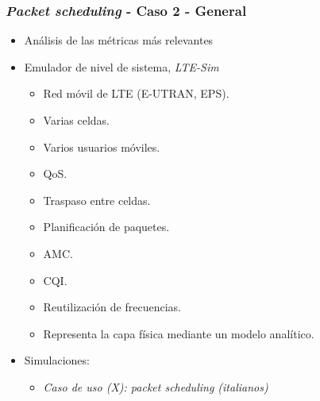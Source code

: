 \documentclass{beamer}
\begin{document}
\begin{frame}
\frametitle{\textit{Packet scheduling} - Caso 2 - General}

\begin{itemize}
\item Análisis de las métricas más relevantes
\item {
	Emulador de nivel de sistema, \textit{LTE-Sim}
	\begin{itemize}
	\item Red móvil de LTE (E-UTRAN, EPS).
	\item Varias celdas.
	\item Varios usuarios móviles.
	\item QoS.
	\item Traspaso entre celdas.
	\item Planificación de paquetes.
	\item AMC.
	\item CQI.
	\item Reutilización de frecuencias.
	\item Representa la capa física mediante un modelo analítico.
	\end{itemize}
}
\item {
	Simulaciones:
	\begin{itemize}
	\item \textit{Caso de uso (X): packet scheduling (italianos)}
	\end{itemize}
}
\end{itemize}
\end{frame}
\end{document}
